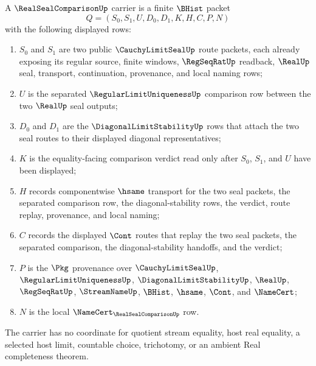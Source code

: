 \begin{definition}
\label{def:real-seal-comparison-carrier}
A $\RealSealComparisonUp$ carrier is a finite $\BHist$ packet
$$
Q=(S_0,S_1,U,D_0,D_1,K,H,C,P,N)
$$
with the following displayed rows:
\begin{enumerate}
\item $S_0$ and $S_1$ are two public $\CauchyLimitSealUp$ route packets, each already exposing its regular source, finite windows, $\RegSeqRatUp$ readback, $\RealUp$ seal, transport, continuation, provenance, and local naming rows;
\item $U$ is the separated $\RegularLimitUniquenessUp$ comparison row between the two $\RealUp$ seal outputs;
\item $D_0$ and $D_1$ are the $\DiagonalLimitStabilityUp$ rows that attach the two seal routes to their displayed diagonal representatives;
\item $K$ is the equality-facing comparison verdict read only after $S_0$, $S_1$, and $U$ have been displayed;
\item $H$ records componentwise $\hsame$ transport for the two seal packets, the separated comparison row, the diagonal-stability rows, the verdict, route replay, provenance, and local naming;
\item $C$ records the displayed $\Cont$ routes that replay the two seal packets, the separated comparison, the diagonal-stability handoffs, and the verdict;
\item $P$ is the $\Pkg$ provenance over $\CauchyLimitSealUp$, $\RegularLimitUniquenessUp$, $\DiagonalLimitStabilityUp$, $\RealUp$, $\RegSeqRatUp$, $\StreamNameUp$, $\BHist$, $\hsame$, $\Cont$, and $\NameCert$;
\item $N$ is the local $\NameCert_{\RealSealComparisonUp}$ row.
\end{enumerate}
The carrier has no coordinate for quotient stream equality, host real equality, a selected host limit, countable choice, trichotomy, or an ambient Real completeness theorem.
\end{definition}

